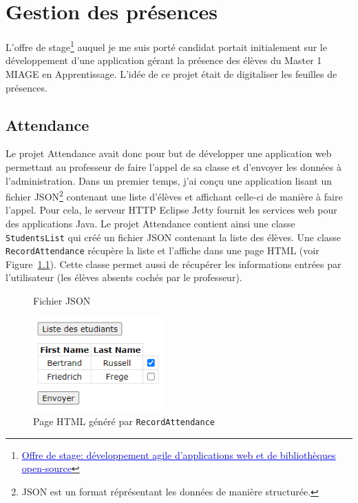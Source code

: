 \chapter[Gestion des présences]{Gestion des présences\raisebox{.3\baselineskip}{\normalsize\footnotemark}}

L'offre de stage\footnote{\href{https://github.com/Dauphine-MIDO/M1-app/blob/master/Stage dev.adoc}{\textcolor{blue}{\underline{Offre de stage: développement agile d’applications web et de bibliothèques open-source}}}} auquel je me suis porté candidat portait initialement sur le développement d'une application gérant la présence des élèves du Master 1 MIAGE en Apprentissage. L'idée de ce projet était de digitaliser les feuilles de présences.

\section{Attendance}

Le projet Attendance avait donc pour but de développer une application web permettant au professeur de faire l'appel de sa classe et d'envoyer les données à l'administration. Dans un premier temps, j'ai conçu une application lisant un fichier JSON\footnote{JSON est un format réprésentant les données de manière structurée.} contenant une liste d'élèves et affichant celle-ci de manière à faire l'appel. Pour cela,  le serveur HTTP Eclipse Jetty fournit les services web pour des applications Java. Le projet Attendance contient ainsi une classe \texttt{StudentsList} qui créé un fichier JSON contenant la liste des élèves. Une classe \texttt{RecordAttendance} récupère la liste et l'affiche dans une page HTML (voir Figure~\ref{attendance}). Cette classe permet aussi de récupérer les informations entrées par l'utilisateur (les élèves absents cochés par le professeur).



\begin{figure}[h]
    \begin{minipage}{0.5\textwidth}
        
        \caption*{Fichier JSON}
        \label{json}
    \end{minipage}
    \begin{minipage}{0.5\textwidth}
        \begin{center}
            \includegraphics[width=5cm]{assets/attendance.PNG}
            \caption{Page HTML généré par \texttt{RecordAttendance}}
            \label{attendance}        
        \end{center}
    \end{minipage}
\end{figure}

